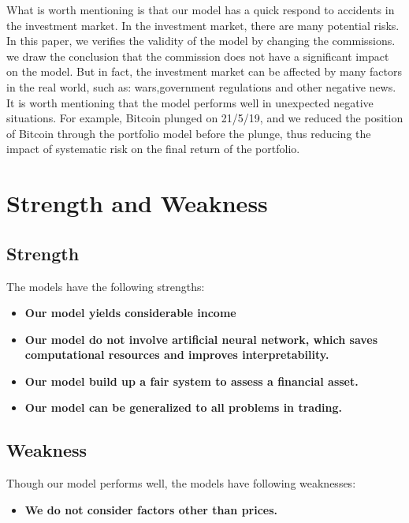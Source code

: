 \documentclass[12pt,a4paper]{article}
\begin{document}
\begin{spacing}{1.2}
What is worth mentioning is that our model has a quick respond to accidents in the investment market. In the investment market, there are many potential risks. In this paper, we verifies the validity of the model by changing the commissions. we draw the conclusion that the commission does not have a significant impact on the model.
But in fact, the investment market can be affected by many factors in the real world, such as: wars,government regulations and other negative news. It is worth mentioning that the model performs well in unexpected negative situations. For example, Bitcoin plunged on 21/5/19, and we reduced the position of Bitcoin through the portfolio model before the plunge, thus reducing the impact of systematic risk on the final return of the portfolio.

\section{Strength and Weakness}
\label{Strength_Weakness}


\subsection{Strength}

The models have the following strengths:

\begin{itemize}
\item \textbf{Our model yields considerable income}

\item \textbf{Our model do not involve artificial neural network, which saves computational resources and improves interpretability.}

\item \textbf{Our model build up a fair system to assess a financial asset.}

\item \textbf{Our model can be generalized to all problems in trading.}

\end{itemize}


\subsection{Weakness}

Though our model performs well, the models have following weaknesses:

\begin{itemize}
\item \textbf{We do not consider factors other than prices.}


\end{itemize}
\end{spacing}
\end{document}

